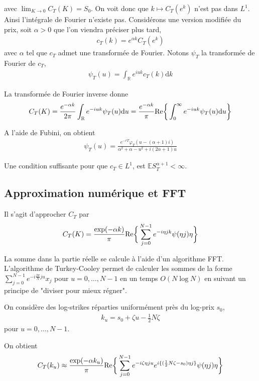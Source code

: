\documentclass{article}
\begin{document}
avec $\lim_{K\to 0} C_T(K)= S_0$. On voit donc que $k \mapsto C_T(e^k)$ n'est pas dans $L^1$. Ainsi l'intégrale de Fourier n'existe pas. Considérons une version modifiée du prix, soit $\alpha >0$ que l'on viendra préciser plus tard,  
\begin{align*}
	c_T(k) = e^{\alpha k}C_T(e^k)
\end{align*}
avec $\alpha$ tel que $c_T$ admet une transformée de Fourier. Notons $\psi_T$ la transformée de Fourier de $c_T$, 
\begin{align*}
	\psi_T(u) = \int_{\mathbb{R}}e^{iuk}c_T(k)\mathrm{d}k
\end{align*}

La transformée de Fourier inverse donne
\begin{align*}
	C_T(K) = \frac{e^{-\alpha k}}{2\pi}\int_{\mathbb{R}}e^{-i u k} \psi_T(u)\mathrm{d}u = \frac{e^{-\alpha k}}{\pi}\textup{Re}\bigg\{\int_{0}^{\infty}e^{-i u k}\psi_T(u)\mathrm{d}u\bigg\}
\end{align*}

A l'aide de Fubini, on obtient
\begin{align*}
\psi_T(u) = \frac{e^{-rT}\varphi_T(u-(\alpha+1)i)}{\alpha^2+\alpha-u^2+i(2\alpha+1)u}
\end{align*}

Une condition suffisante pour que $c_T \in L^1$, est $\mathbb{E}S_T^{\alpha+1} < \infty$.
\subsection{Approximation numérique et FFT}
Il s'agit d'approcher $C_T$ par 
\begin{align*}
	C_T(K) = \frac{\exp(-\alpha k)}{\pi}\textup{Re}\bigg\{\sum_{j=0}^{N-1} e^{-i \eta j k}\psi(\eta j)\eta\bigg\}
\end{align*}

La somme dans la partie réelle se calcule à l'aide d'un algorithme FFT. L'algorithme de Turkey-Cooley permet de calculer les sommes de la forme $\sum_{j=0}^{N-1} e^{-i\frac{2\pi}{N} j u} x_j$ pour $u=0,\ldots, N-1$ en un temps $O(N\log N)$ en suivant un principe de "diviser pour mieux régner".

On considère des log-strikes réparties uniformément près du log-prix $s_0$, 
\begin{align*}
	k_u = s_0 + \zeta u - \frac{1}{2}N\zeta
\end{align*}
pour $u = 0, \ldots, N-1$.

On obtient
\begin{align*}
	C_T(k_u) \approx \frac{\exp(-\alpha k_u)}{\pi} \textup{Re}\bigg\{\sum_{j=0}^{N-1}e^{-i\zeta \eta j u} e^{i\{(\frac{1}{2}N\zeta-s_0)\eta j\}}\psi(\eta j)\eta\bigg\}
\end{align*}
\end{document}
